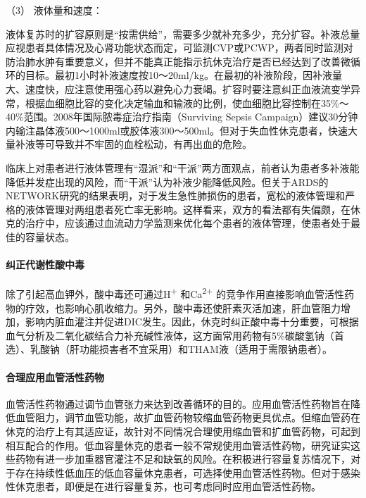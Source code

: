 \hypertarget{text00055.htmlux5cux23CHP2-1-3-2-2-3}{}
（3） 液体量和速度：

液体复苏时的扩容原则是“按需供给”，需要多少就补充多少，充分扩容。补液总量应视患者具体情况及心肾功能状态而定，可监测CVP或PCWP，两者同时监测对防治肺水肿有重要意义，但并不能真正能指示抗休克治疗是否已经达到了改善微循环的目标。最初1小时补液速度按10～20ml/kg。在最初的补液阶段，因补液量大、速度快，应注意使用强心药以避免心力衰竭。扩容时要注意纠正血液流变学异常，根据血细胞比容的变化决定输血和输液的比例，使血细胞比容控制在35\%～40\%范围。2008年国际脓毒症治疗指南（Surviving
Sepsis
Campaign）建议30分钟内输注晶体液500～1000ml或胶体液300～500ml。但对于失血性休克患者，快速大量补液等可导致并不牢固的血栓松动，有再出血的危险。

临床上对患者进行液体管理有“湿派”和“干派”两方面观点，前者认为患者多补液能降低并发症出现的风险，而“干派”认为补液少能降低风险。但关于ARDS的NETWORK研究的结果表明，对于发生急性肺损伤的患者，宽松的液体管理和严格的液体管理对两组患者死亡率无影响。这样看来，双方的看法都有失偏颇，在休克的治疗中，应该通过血流动力学监测来优化每个患者的液体管理，使患者处于最佳的容量状态。

\paragraph{纠正代谢性酸中毒}

除了引起高血钾外，酸中毒还可通过H\textsuperscript{+}
和Ca\textsuperscript{2+}
的竞争作用直接影响血管活性药物的疗效，也影响心肌收缩力。另外，酸中毒还使肝素灭活加速，肝血管阻力增加，影响内脏血灌注并促进DIC发生。因此，休克时纠正酸中毒十分重要，可根据血气分析及二氧化碳结合力补充碱性液体，这方面常用药物有5\%碳酸氢钠（首选）、乳酸钠（肝功能损害者不宜采用）和THAM液（适用于需限钠患者）。

\paragraph{合理应用血管活性药物}

血管活性药物通过调节血管张力来达到改善循环的目的。应用血管活性药物旨在降低血管阻力，调节血管功能，故扩血管药物较缩血管药物更具优点。但缩血管药在休克的治疗上有其适应证，故针对不同情况合理使用缩血管和扩血管药物，可起到相互配合的作用。低血容量休克的患者一般不常规使用血管活性药物，研究证实这些药物有进一步加重器官灌注不足和缺氧的风险。在积极进行容量复苏情况下，对于存在持续性低血压的低血容量休克患者，可选择使用血管活性药物。但对于感染性休克患者，即便是在进行容量复苏，也可考虑同时应用血管活性药物。

